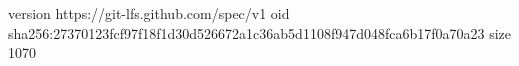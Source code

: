 version https://git-lfs.github.com/spec/v1
oid sha256:27370123fcf97f18f1d30d526672a1c36ab5d1108f947d048fca6b17f0a70a23
size 1070
